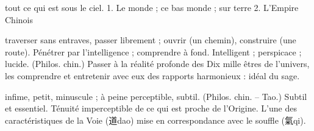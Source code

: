 \begin{Def}[tianxia 天下]
    tout ce qui est sous le ciel. 1. Le monde ; ce bas monde ; sur terre 2. L’Empire Chinois
\end{Def}
\begin{Def}[tong 通]
    traverser sans entraves, passer librement ; ouvrir (un chemin), construire (une route).     Pénétrer par l’intelligence ; comprendre à fond. Intelligent ; perspicace ; lucide.     (Philos. chin.) Passer à la réalité profonde des Dix mille êtres de l’univers, les comprendre et entretenir avec eux des rapports harmonieux : idéal du sage.
\end{Def}
\begin{Def}[wei 微]
    infime, petit, minuscule ; à peine perceptible, subtil. (Philos. chin. – Tao.) Subtil et essentiel. Ténuité imperceptible de ce qui est proche de l’Origine. L’une des caractéristiques de la Voie (道dao) mise en correspondance avec le souffle (氣qi). 
\end{Def}

